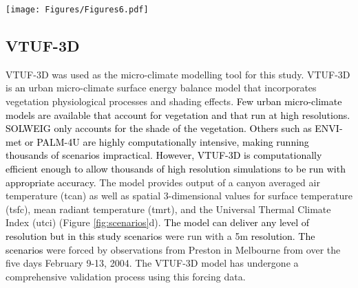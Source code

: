 \documentclass[final,3p,times,authoryear]{elsarticle}
\newcommand{\add}[1]{\textcolor{black}{#1}}
\newcommand{\remove}[1]{\textcolor{red}{\st{}}}
\begin{document}
\begin{figure*}
\centering
\texttt{[image: Figures/Figures6.pdf]}
\caption{\bf Three example scenarios from the 9814 modelled in the project, a) 49\% grass, 50\% trees, 0.5\% roads, 0.5\% building, mean building height 5.0m, mean vegetation height 15.0m (7.5m averaged across domain), b) 9\% grass, 0\% trees, 31\% roads, 60\% building, mean building height 49.8m (30.0m averaged across domain), mean vegetation height 0m, c) 9\% grass, 10\% trees, 71\% roads, 10\% building, mean building height 14.8m (1.5m averaged across domain), mean vegetation height 0.5m. Building heights are given as average heights of buildings (and an area-weighted average building height). Vegetation heights follow the same pattern. d) Modelled 3-dimensional results of \gls{utci} for scenario (c) at 2pm February 12, 2004. Note, VTUF-3D nests a central area of interest in 9 identical surrounding areas and this visualisation includes some of these surrounding nested results. }
 \label{fig:scenarios}
\end{figure*} 

\subsection{VTUF-3D}\label{sec:methodsvtuf}
VTUF-3D \citep{Nice2018a} was used as the micro-climate modelling tool for this study. VTUF-3D is \remove{a}\add{an} urban micro-climate surface energy balance model that incorporates vegetation physiological processes and shading effects. \add{Few urban micro-climate models are available that account for vegetation and that run at high resolutions. SOLWEIG only accounts for the shade of the vegetation. Others such as ENVI-met or PALM-4U are highly computationally intensive, making running thousands of scenarios impractical. However, VTUF-3D is computationally efficient enough to allow thousands of high resolution simulations to be run with appropriate accuracy.} The model provides output of a canyon averaged air temperature (\gls{tcan}) as well as spatial 3-dimensional values for surface temperature (\gls{tsfc}), mean radiant temperature (\gls{tmrt}), and the Universal Thermal Climate Index (\gls{utci}) (Figure \ref{fig:scenarios}d). \remove{Scenarios}\add{The model can deliver any level of resolution but in this study scenarios} were run with a 5m \remove{resolution and}\add{resolution. The scenarios} were forced by observations from Preston in Melbourne from \cite{Coutts2007} over the five days February 9-13, 2004. The VTUF-3D model has undergone a comprehensive validation process \citep{Nice2016,Nice2018a} using this forcing data.
\end{document}
